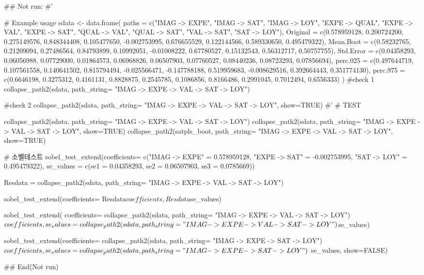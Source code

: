 \documentclass[a4paper]{book}
\begin{document}
\begin{Examples}
\begin{ExampleCode}

\#\# Not run: 
#'

# Example usage
sdata <- data.frame(
  paths = c("IMAG -> EXPE", "IMAG -> SAT", "IMAG -> LOY",
   "EXPE -> QUAL", "EXPE -> VAL", "EXPE -> SAT",
            "QUAL -> VAL", "QUAL -> SAT",
            "VAL -> SAT", "SAT -> LOY"),
  Original = c(0.578959128, 0.200724200, 0.275149576,
   0.848344408, 0.105477650, -0.002753995,
               0.676655529, 0.122144566, 0.589330650, 0.495479322),
  Mean.Boot = c(0.58232765, 0.21209094, 0.27486564,
  0.84793899, 0.10992051, -0.01008222,
                0.67780527, 0.15132543, 0.56312717, 0.50757755),
  Std.Error = c(0.04358293, 0.06056988, 0.07729000,
  0.01864573, 0.06968826, 0.06507903,
                0.07760527, 0.08440236, 0.08723293, 0.07856694),
  perc.025 = c(0.497644719, 0.107561558, 0.140641502,
   0.815794494, -0.025566471, -0.147788188,
               0.519959683, -0.008629516, 0.392664443, 0.351774130),
  perc.975 = c(0.6646198, 0.3275312, 0.4161131,
   0.8828875, 0.2545785, 0.1086856,
               0.8166486, 0.2991045, 0.7012494, 0.6556333)
)
#check 1
collapse_path2(sdata, path_string= "IMAG -> EXPE -> VAL -> SAT -> LOY")

#check 2
collapse_path2(sdata, path_string= "IMAG -> EXPE -> VAL -> SAT -> LOY", show=TRUE)
#'
# TEST

collapse_path2(sdata, path_string= "IMAG -> EXPE -> VAL -> SAT -> LOY")
collapse_path2(sdata, path_string= "IMAG -> EXPE -> VAL -> SAT -> LOY", show=TRUE)
collapse_path2(satpls_boot, path_string= "IMAG -> EXPE -> VAL -> SAT -> LOY", show=TRUE)

# 소벨테스트
sobel_test_extend(coefficients= c("IMAG -> EXPE" = 0.578959128,
                                  "EXPE -> SAT" = -0.002753995,
                                  "SAT -> LOY" = 0.495479322),
                  se_values = c(se1 = 0.04358293,
                                se2 = 0.06507903,
                                se3 = 0.0785669))


Resdata  =   collapse_path2(sdata, path_string= "IMAG -> EXPE -> VAL -> SAT -> LOY")

sobel_test_extend(coefficients= Resdata$coefficients, Resdata$se_values)


sobel_test_extend(
  coefficients= collapse_path2(sdata,
              path_string= "IMAG -> EXPE -> VAL -> SAT -> LOY")$coefficients,
  se_values =  collapse_path2(sdata,
        path_string= "IMAG -> EXPE -> VAL -> SAT -> LOY")$se_values)


sobel_test_extend(coefficients= collapse_path2(sdata,
         path_string=  "IMAG -> EXPE -> SAT -> LOY")$coefficients,
         se_values =  collapse_path2(sdata, path_string= "IMAG -> EXPE -> SAT -> LOY")$
                    se_values, show=FALSE)


## End(Not run)


\end{ExampleCode}
\end{Examples}
\end{document}
